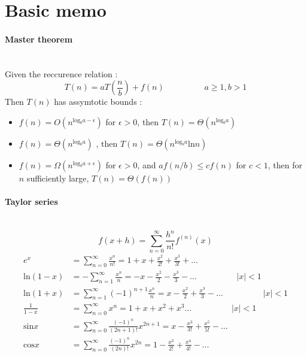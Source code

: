 \documentclass[a4paper,10pt]{article}
\begin{document}
\begin{center}\end{center}
\section{Basic memo}
\paragraph{Master theorem}~\cite{CORMEN2009}\mbox{} \\
Given the reccurence relation :
\[
T(n)=aT(\frac{n}{b}) + f(n) \hspace{2cm}  a\geq 1 , b > 1
\]
Then $T(n)$ has assymtotic bounds :
\begin{itemize}
	\item $f(n)=O(n^{\text{log}_ba-\epsilon})$ for $\epsilon>0$, then $T(n)=\Theta(n^{\text{log}_ba})$
	\item  $f(n)=\Theta(n^{\text{log}_ba})$ , then $T(n)=\Theta(n^{\text{log}_ba}\text{ln}n)$
	\item  $f(n)=\Omega(n^{\text{log}_ba+\epsilon})$ for $\epsilon>0$, and $af(n/b)\leq cf(n)$ for $c<1$, then for $n$ sufficiently large, $T(n)=\Theta(f(n))$
\end{itemize}
\paragraph{Taylor series}\mbox{} \\
\[
f(x+h) = \sum_{n=0}^{\infty} \frac{h^n}{n!}f^{(n)}(x)
\]
\begin{align}
e^x &= \sum_{n=0}^{\infty} \frac{x^n}{n!} = 1+x+\frac{x^2}{2!}+\frac{x^3}{3!}+\ldots \\
\text{ln}(1-x) &= -\sum_{n=1}^{\infty} \frac{x^n}{n} = -x -\frac{x^2}{2} - \frac{x^3}{3}-\ldots  \hspace{2cm} |x|<1 \\
\text{ln}(1+x) &= \sum_{n=1}^{\infty} (-1)^{n+1} \frac{x^n}{n} = x -\frac{x^2}{2} + \frac{x^3}{3}-\ldots \hspace{2cm} |x|<1 \\
\frac{1}{1-x} &= \sum_{n=0}^{\infty} x^n = 1+x +x^2 + x^3 \ldots \hspace{2cm} |x|<1 \\
\text{sin}x &= \sum_{n=0}^{\infty} \frac{(-1)^{n}}{(2n+1)!} x^{2n+1} = x-\frac{x^3}{3!}+\frac{x^5}{5!}-\ldots \\
\text{cos}x &= \sum_{n=0}^{\infty} \frac{(-1)^{n}}{(2n)!} x^{2n} =1-\frac{x^2}{2!}+\frac{x^4}{4!}-\ldots
\end{align}
\end{document}
